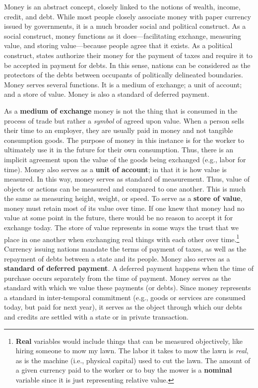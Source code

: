 \documentclass[
]{book}
\begin{document}
Money is an abstract concept, closely linked to the notions of wealth, income, credit, and debt. While most people closely associate money with paper currency issued by governments, it is a much broader social and political construct. As a social construct, money functions as it does---facilitating exchange, measuring value, and storing value---because people agree that it exists. As a political construct, states authorize their money for the payment of taxes and require it to be accepted in payment for debts. In this sense, nations can be considered as the protectors of the debts between occupants of politically delineated boundaries. Money serves several functions. It is a medium of exchange; a unit of account; and a store of value. Money is also a standard of deferred payment.

As a \textbf{medium of exchange} money is not the thing that is consumed in the process of trade but rather a \emph{symbol} of agreed upon value. When a person sells their time to an employer, they are usually paid in money and not tangible consumption goods. The purpose of money in this instance is for the worker to ultimately use it in the future for their own consumption. Thus, there is an implicit agreement upon the value of the goods being exchanged (e.g., labor for time). Money also serves as a \textbf{unit of account}; in that it is how value is measured. In this way, money serves as standard of measurement. Thus, value of objects or actions can be measured and compared to one another. This is much the same as measuring height, weight, or speed. To serve as a \textbf{store of value}, money must retain most of its value over time. If one knew that money had no value at some point in the future, there would be no reason to accept it for exchange today. The store of value represents in some ways the trust that we place in one another when exchanging real things with each other over time.\footnote{\textbf{Real} variables would include things that can be measured objectively, like hiring someone to mow my lawn. The labor it takes to mow the lawn is \emph{real}, as is the machine (i.e., physical capital) used to cut the lawn. The amount of a given currency paid to the worker or to buy the mower is a \textbf{nominal} variable since it is just representing relative value.} Currency issuing nations mandate the terms of payment of taxes, as well as the repayment of debts between a state and its people. Money also serves as a \textbf{standard of deferred payment}. A deferred payment happens when the time of purchase occurs separately from the time of payment. Money serves as the standard with which we value these payments (or debts). Since money represents a standard in inter-temporal commitment (e.g., goods or services are consumed today, but paid for next year), it serves as the object through which our debts and credits are settled with a state or in private transaction.
\end{document}
